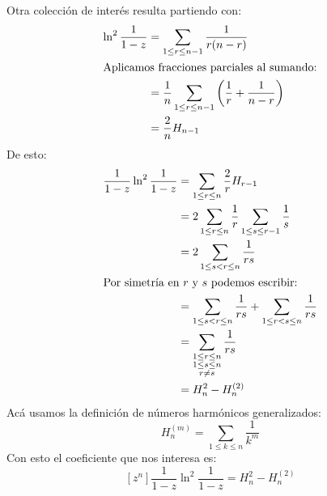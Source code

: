   Otra colección de interés resulta partiendo con:
  \begin{align}
    [z^n] \ln^2 \frac{1}{1 - z}
      &= \sum_{1 \le r \le n - 1} \frac{1}{r (n - r)} \notag \\
  \intertext{Aplicamos fracciones parciales al sumando:}
      &= \frac{1}{n}
	   \sum_{1 \le r \le n - 1}
	     \left( \frac{1}{r} + \frac{1}{n - r} \right) \notag \\
      &= \frac{2}{n} H_{n - 1}
	     \label{eq:ln:0-2:coef}
  \end{align}
  De esto:
  \begin{align*}
    [z^n]\frac{1}{1 - z} \ln^2 \frac{1}{1 - z}
      &= \sum_{1 \le r \le n} \frac{2}{r} H_{r - 1} \\
      &= 2 \sum_{1 \le r \le n}
	     \frac{1}{r} \sum_{1 \le s \le r - 1} \frac{1}{s} \\
      &= 2 \sum_{1 \le s < r \le n} \frac{1}{r s} \\
  \intertext{Por simetría en \(r\) y \(s\) podemos escribir:}
      &= \sum_{1 \le s < r \le n} \frac{1}{r s}
	   + \sum_{1 \le r < s \le n} \frac{1}{r s} \\
      &= \sum_{\substack{1 \le r \le n \\
			 1 \le s \le n \\
			 r \ne s}} \frac{1}{r s} \\
      &= H^2_n - H^{(2)}_n
  \end{align*}
  Acá usamos la definición de números harmónicos generalizados:%
  \begin{equation}
    \label{eq:H(m)n}
    H^{(m)}_n
      = \sum_{1 \le k \le n} \frac{1}{k^m}
  \end{equation}
  Con esto el coeficiente que nos interesa es:
  \begin{equation}
    \label{eq:ln:1-2:coef}
    [z^n] \frac{1}{1 - z} \ln^2 \frac{1}{1 - z}
      = H^2_n - H^{(2)}_n
  \end{equation}


